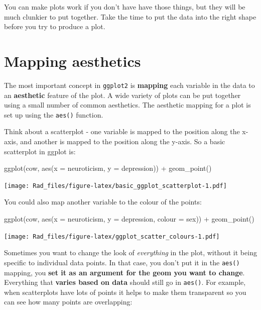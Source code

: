 \documentclass[
]{book}
\newenvironment{Shaded}{\begin{snugshade}}{\end{snugshade}}
\newcommand{\AttributeTok}[1]{\textcolor[rgb]{0.77,0.63,0.00}{#1}}
\newcommand{\FunctionTok}[1]{\textcolor[rgb]{0.00,0.00,0.00}{#1}}
\newcommand{\NormalTok}[1]{#1}
\newcommand{\SpecialCharTok}[1]{\textcolor[rgb]{0.00,0.00,0.00}{#1}}
\begin{document}
You can make plots work if you don't have have those
things, but they will be much clunkier to put together.
Take the time to put the data into the right shape
before you try to produce a plot.

\hypertarget{mapping-aesthetics}{%
\section{Mapping aesthetics}\label{mapping-aesthetics}}

The most important concept in \texttt{ggplot2} is \textbf{mapping}
each variable in the data to an \textbf{aesthetic} feature
of the plot. A wide variety of plots can be put together
using a small number of common aesthetics. The aesthetic
mapping for a plot is set up using the \texttt{aes()} function.

Think about a scatterplot - one variable is mapped
to the position along the x-axis, and another
is mapped to the position along the y-axis. So
a basic scatterplot in ggplot is:

\begin{Shaded}
\begin{Highlighting}[]
\FunctionTok{ggplot}\NormalTok{(cow, }\FunctionTok{aes}\NormalTok{(}\AttributeTok{x =}\NormalTok{ neuroticism, }\AttributeTok{y =}\NormalTok{ depression)) }\SpecialCharTok{+}
    \FunctionTok{geom\_point}\NormalTok{()}
\end{Highlighting}
\end{Shaded}

\texttt{[image: Rad\_files/figure-latex/basic\_ggplot\_scatterplot-1.pdf]}

You could also map another variable to the colour of the points:

\begin{Shaded}
\begin{Highlighting}[]
\FunctionTok{ggplot}\NormalTok{(cow, }
       \FunctionTok{aes}\NormalTok{(}\AttributeTok{x =}\NormalTok{ neuroticism, }\AttributeTok{y =}\NormalTok{ depression, }\AttributeTok{colour =}\NormalTok{ sex)) }\SpecialCharTok{+}
    \FunctionTok{geom\_point}\NormalTok{()}
\end{Highlighting}
\end{Shaded}

\texttt{[image: Rad\_files/figure-latex/ggplot\_scatter\_colours-1.pdf]}

Sometimes you want to change the look of \emph{everything} in the plot,
without it being specific to individual data points. In that
case, you don't put it in the \texttt{aes()} mapping, you \textbf{set it as an
argument for the geom you want to change}. Everything
that \textbf{varies based on data} should still go in \texttt{aes()}. For
example, when scatterplots have lots of points it helps
to make them transparent so you can see how many points
are overlapping:
\end{document}
